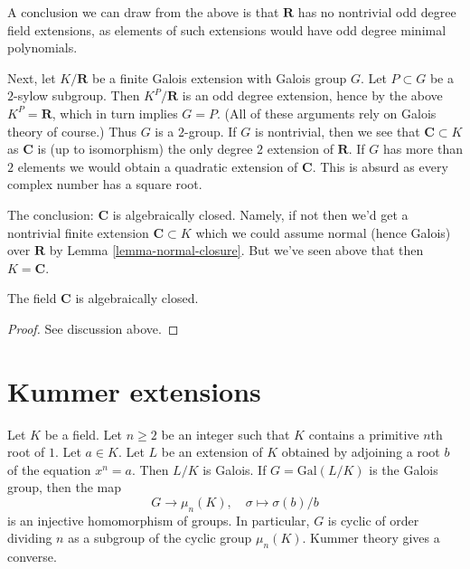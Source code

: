 \medskip\noindent
A conclusion we can draw from the above is that $\mathbf{R}$ has
no nontrivial odd degree field extensions, as elements of such extensions
would have odd degree minimal polynomials.

\medskip\noindent
Next, let $K/\mathbf{R}$ be a finite Galois extension with Galois group $G$.
Let $P \subset G$ be a $2$-sylow subgroup. Then $K^P/\mathbf{R}$ is an
odd degree extension, hence by the above $K^P = \mathbf{R}$,
which in turn implies
$G = P$. (All of these arguments rely on Galois theory of course.)
Thus $G$ is a $2$-group. If $G$ is nontrivial, then we see that
$\mathbf{C} \subset K$ as $\mathbf{C}$ is (up to isomorphism) the only
degree $2$ extension of $\mathbf{R}$. If $G$ has more than $2$ elements
we would obtain a quadratic extension of $\mathbf{C}$.
This is absurd as every complex number has a square root.

\medskip\noindent
The conclusion: $\mathbf{C}$ is algebraically closed. Namely, if not
then we'd get a nontrivial finite extension $\mathbf{C} \subset K$
which we could assume normal (hence Galois) over $\mathbf{R}$ by
Lemma \ref{lemma-normal-closure}. But we've seen above that then
$K = \mathbf{C}$.

\begin{lemma}
\label{lemma-C-algebraically-closed}
The field $\mathbf{C}$ is algebraically closed.
\end{lemma}

\begin{proof}
See discussion above.
\end{proof}





\section{Kummer extensions}
\label{section-Kummer}

\noindent
Let $K$ be a field. Let $n \geq 2$ be an integer such that $K$ contains
a primitive $n$th root of $1$. Let $a \in K$. Let $L$ be an extension
of $K$ obtained by adjoining a root $b$ of the equation $x^n = a$.
Then $L/K$ is Galois. If $G = \text{Gal}(L/K)$ is the Galois group, then
the map
$$
G \longrightarrow \mu_n(K),\quad \sigma \longmapsto \sigma(b)/b
$$
is an injective homomorphism of groups. In particular, $G$ is cyclic
of order dividing $n$ as a subgroup of the cyclic group $\mu_n(K)$.
Kummer theory gives a converse.

